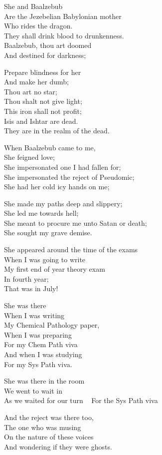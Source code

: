\documentclass[
]{book}
\begin{document}
She and Baalzebub\\
Are the Jezebelian Babylonian mother\\
Who rides the dragon.\\
They shall drink blood to drunkenness.\\
Baalzebub, thou art doomed\\
And destined for darkness;

Prepare blindness for her\\
And make her dumb;\\
Thou art no star;\\
Thou shalt not give light;\\
This iron shall not profit;\\
Isis and Ishtar are dead.\\
They are in the realm of the dead.

When Baalzebub came to me,\\
She feigned love;\\
She impersonated one I had fallen for;\\
She impersonated the reject of Pseudomic;\\
She had her cold icy hands on me;

She made my paths deep and slippery;\\
She led me towards hell;\\
She meant to procure me unto Satan or death;\\
She sought my grave demise.

She appeared around the time of the exams\\
When I was going to write\\
My first end of year theory exam\\
In fourth year;\\
That was in July!

She was there\\
When I was writing\\
My Chemical Pathology paper,\\
When I was preparing\\
For my Chem Path viva\\
And when I was studying\\
For my Sys Path viva.

She was there in the room\\
We went to wait in\\
As we waited for our turn ~
For the Sys Path viva

And the reject was there too,\\
The one who was musing\\
On the nature of these voices\\
And wondering if they were ghosts.
\end{document}
